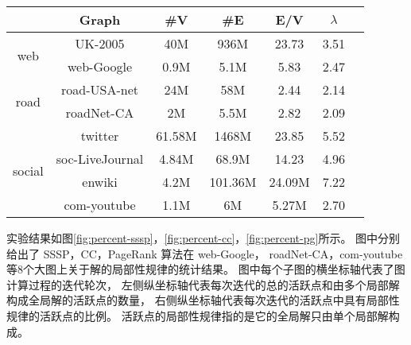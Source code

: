 \begin{table}[H]
  \centering
  \label{tab:experimental_data_set}
    \begin{tabular}{ccccccc}
     \toprule[1.5pt]
     & \textbf{Graph} & \textbf{\#V} & \textbf{\#E} & \textbf{E/V} & \textbf{$\lambda$} } \\
     \midrule[1pt]
     \multirow{2}{*}{web} & UK-2005 & 40M & 936M & 23.73 & 3.51  \\
                                         & web-Google & 0.9M & 5.1M & 5.83 & 2.47 \\
     \cmidrule(lr){1-6}
      \multirow{2}{*}{road} & road-USA-net & 24M & 58M & 2.44 & 2.14 \\
                                          & roadNet-CA & 2M & 5.5M & 2.82 & 2.09 \\
      \cmidrule(lr){1-6}
      \multirow{4}{*}{social} & twitter & 61.58M & 1468M & 23.85 & 5.52 \\
                                          & soc-LiveJournal & 4.84M & 68.9M & 14.23 & 4.96 \\
                                          & enwiki & 4.2M & 101.36M & 24.09M & 7.22 \\
                                          & com-youtube & 1.1M & 6M & 5.27M & 2.70 \\
     \bottomrule[1.5pt]
    \end{tabular}
\end{table}

实验结果如图\ref{fig:percent-sssp}，\ref{fig:percent-cc}，\ref{fig:percent-pg}所示。
图中分别给出了 SSSP，CC，PageRank 算法在 
web-Google， roadNet-CA，com-youtube
等8个大图上关于解的局部性规律的统计结果。
图中每个子图的横坐标轴代表了图计算过程的迭代轮次，
左侧纵坐标轴代表每次迭代的总的活跃点和由多个局部解构成全局解的活跃点的数量，
右侧纵坐标轴代表每次迭代的活跃点中具有局部性规律的活跃点的比例。
活跃点的局部性规律指的是它的全局解只由单个局部解构成。


